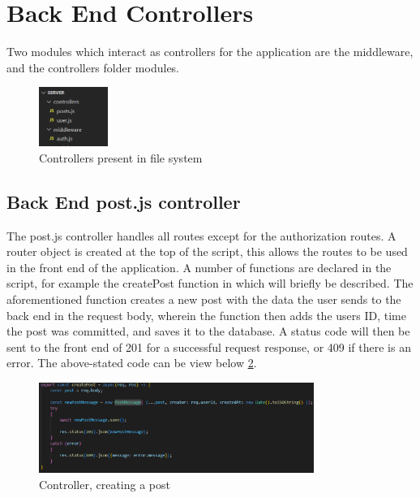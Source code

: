 \newpage
\section{Back End Controllers}
Two modules which interact as controllers for the application are the middleware, and the controllers folder modules.
\begin{figure}[h!]
    \centering
    \includegraphics[width=0.2\textwidth]{images/Controllers.png}
    \caption{Controllers present in file system}
    \label{image:Controllers}
\end{figure}

\subsection{Back End post.js controller}
The post.js controller handles all routes except for the authorization routes. A router object is created at the top of the script, this allows the routes to be used in the front end of the application. A number of functions are declared in the script, for example the createPost function in which will briefly be described. The aforementioned function creates a new post with the data the user sends to the back end in the request body, wherein the function then adds the users ID, time the post was committed, and saves it to the database. A status code will then be sent to the front end of 201 for a successful request response, or 409 if there is an error. The above-stated code can be view below \ref{image:createPost}.
\begin{figure}[h!]
    \centering
    \includegraphics[width=0.8\textwidth]{images/createPost.png}
    \caption{Controller, creating a post}
    \label{image:createPost}
\end{figure}

